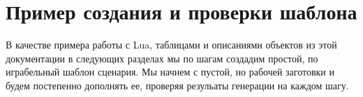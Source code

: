 \section{Пример создания и проверки шаблона}
В качестве примера работы с Lua, таблицами и описаниями объектов из этой документации в следующих разделах мы по шагам создадим простой, по играбельный шаблон сценария. Мы начнем с пустой, но рабочей заготовки и будем постепенно дополнять ее, проверяя резульаты генерации на каждом шагу.


\newpage

\newpage

\newpage